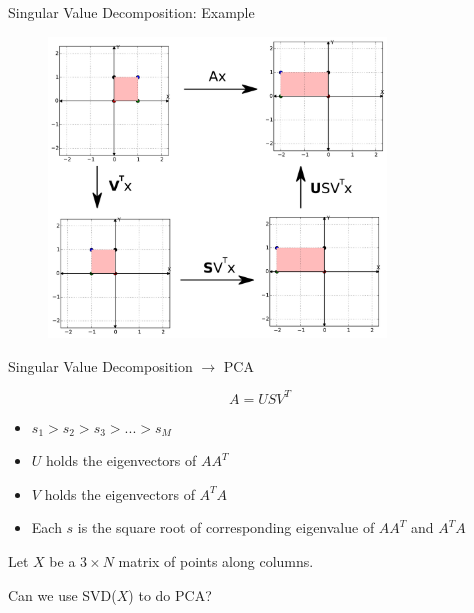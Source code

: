 \documentclass{beamer}
\begin{document}
\begin{frame}{Singular Value Decomposition: Example}

\begin{figure}[t]
	\centering
    \includegraphics[width=0.8\textwidth]{2DScaleAll.pdf}
\end{figure}


\end{frame}

\begin{frame}{Singular Value Decomposition $\rightarrow$ PCA}

\[ A = U S V^T \]



\begin{itemize}[label=$\vartriangleright$]

\item $s_1 > s_2 > s_3 > ... > s_M$

\item $U$ holds the eigenvectors of $AA^T$

\item $V$ holds the eigenvectors of $A^TA$

\item Each $s$ is the square root of corresponding eigenvalue of $AA^T$ and $A^TA$

\end{itemize}

Let $X$ be a $3 \times N$ matrix of points along columns.

Can we use SVD($X$) to do PCA?

\end{frame}
\end{document}

